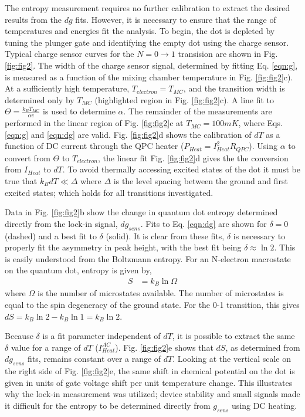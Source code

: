 \documentclass[twocolumn,showpacs,preprintnumbers,amsmath,amssymb,pra,aps,superscriptaddress]{revtex4-1}
\begin{document}
The entropy measurement requires no further calibration to extract the desired results from the $dg$ fits. However, it is necessary to ensure that the range of temperatures and energies fit the analysis. To begin, the dot is depleted by tuning the plunger gate and identifying the empty dot using the charge sensor. Typical charge sensor curves for the $N=0 \rightarrow 1$ transision are shown in Fig. \ref{fig:fig2}. The width of the charge sensor signal, determined by fitting Eq. \ref{eqn:g}, is measured as a function of the mixing chamber temperature in Fig. \ref{fig:fig2}c). At a sufficiently high temperature, $T_{electron}=T_{MC}$, and the transition width is determined only by $T_{MC}$ (highlighted region in Fig. \ref{fig:fig2}c). A line fit to $\Theta = \frac{k_B T_{MC}}{\alpha e}$ is used to determine $\alpha$. The remainder of the measurements are performed in the linear region of Fig. \ref{fig:fig2}c at $T_{MC} = 100mK$, where Eqs. \ref{eqn:g} and \ref{eqn:dg} are valid. Fig. \ref{fig:fig2}d shows the calibration of $dT$ as a function of DC current through the QPC heater ($P_{Heat} = I^2_{Heat} R_{QPC}$). Using $\alpha$ to convert from $\Theta$ to $T_{electron}$, the linear fit Fig. \ref{fig:fig2}d gives the the conversion from $I_{Heat}$ to $dT$. To avoid thermally accessing excited states of the dot it must be true that $k_B dT \ll \Delta$ where $\Delta$ is the level spacing between the ground and first excited states; which holds for all transitions investigated.

Data in Fig. \ref{fig:fig2}b show the change in quantum dot entropy determined directly from the lock-in signal, $dg_{sens}$. Fits to Eq. \ref{eqn:dg} are shown for $\delta=0$ (dashed) and a best fit to $\delta$ (solid). It is clear from these fits, $\delta$ is necessary to properly fit the asymmetry in peak height, with the best fit being $\delta \approx \ln{2}$. This is easily understood from the Boltzmann entropy. For an N-electron macrostate on the quantum dot, entropy is given by,
%
\begin{align}
\label{eqn:S}
        S &= k_B \ln{\Omega}
\end{align}
%
where $\Omega$ is the number of microstates available. The number of microstates is equal to the spin degeneracy of the ground state. For the 0-1 transition, this gives $dS =  k_B\ln{2} - k_B \ln{1} = k_B\ln{2}$.

Because $\delta$ is a fit parameter independent of $dT$, it is possible to extract the same $\delta$ value for a range of $dT$ ($I^{AC}_{Heat}$). Fig. \ref{fig:fig2}e shows that $dS$, as determined from $dg_{sens}$ fits, remains constant over a range of $dT$. Looking at the vertical scale on the right side of Fig. \ref{fig:fig2}e, the same shift in chemical potential on the dot is given in units of gate voltage shift per unit temperature change. This illustrates why the lock-in measurement was utilized; device stability and small signals made it difficult for the entropy to be determined directly from $g_{sens}$ using DC heating.
\end{document}

